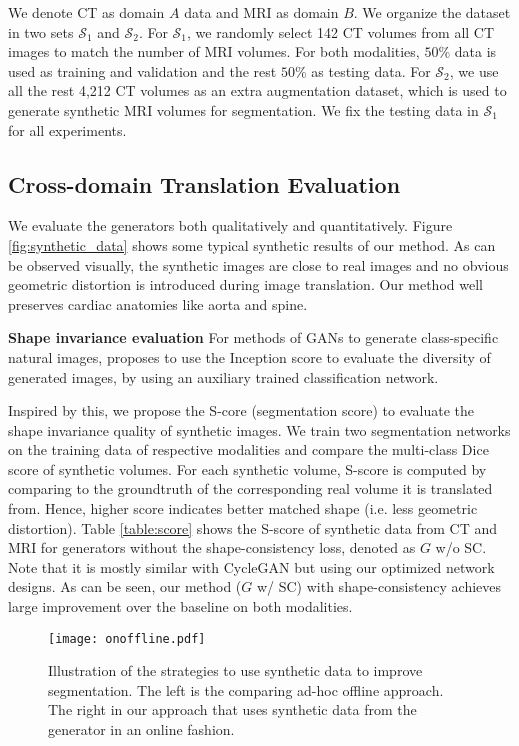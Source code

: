 \documentclass[10pt,twocolumn,letterpaper]{article}
\begin{document}
We denote CT as domain $A$ data and MRI as domain $B$.  We organize the dataset in two sets $\mathcal{S}_1$ and $\mathcal{S}_2$. For $\mathcal{S}_1$, we randomly select 142 CT volumes from all CT images to match the number of MRI volumes. For both modalities, $50\%$ data is used as training and validation and the rest $50 \%$ as testing data. 
For $\mathcal{S}_2$, we use all the rest 4,212 CT volumes as an extra augmentation dataset, which is used to generate synthetic MRI volumes for segmentation.
We fix the testing data in $\mathcal{S}_1$ for all experiments.


\subsection{Cross-domain Translation Evaluation}
We evaluate the generators both qualitatively and quantitatively.
Figure \ref{fig:synthetic_data} shows some typical synthetic results of our method.
As can be observed visually, the synthetic images are close to real images and no obvious geometric distortion is introduced during image translation. Our method well preserves cardiac anatomies like aorta and spine. 
                                     
\noindent
\textbf{Shape invariance evaluation}  For methods of GANs to generate class-specific natural images, \cite{salimans2016improved} proposes to use the Inception score to evaluate the diversity of generated images, by using an auxiliary trained classification network.

Inspired by this, we propose the S-core (segmentation score) to evaluate the shape invariance quality of synthetic images. We train two segmentation networks on the training data of respective modalities and compare the multi-class Dice score of synthetic volumes. For each synthetic volume, S-score is computed by comparing to the groundtruth of the corresponding real volume it is translated from. Hence, higher score indicates better matched shape (i.e. less geometric distortion). 
Table \ref{table:score} shows the S-score of synthetic data from CT and MRI for generators without the shape-consistency loss, denoted as $G$ w/o SC. Note that it is mostly similar with CycleGAN but using our optimized network designs. As can be seen, our method ($G$ w/ SC) with shape-consistency achieves large improvement over the baseline on both modalities. 

\begin{figure}[t]
	\begin{center}
		\texttt{[image: onoffline.pdf]}
	\end{center}
	\vspace{-.2cm}
	\caption{Illustration of the strategies to use synthetic data to improve segmentation. The left is the comparing ad-hoc offline approach. The right in our approach that uses synthetic data from the generator in an online fashion.} \label{fig:onoffline}
\end{figure}
\end{document}

